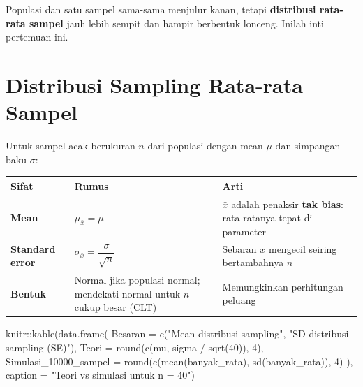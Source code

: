 \documentclass[
  indonesian,
  letterpaper,
]{book}
\newenvironment{Shaded}{\begin{snugshade}}{\end{snugshade}}
\newcommand{\AttributeTok}[1]{\textcolor[rgb]{0.40,0.45,0.13}{#1}}
\newcommand{\DecValTok}[1]{\textcolor[rgb]{0.68,0.00,0.00}{#1}}
\newcommand{\FunctionTok}[1]{\textcolor[rgb]{0.28,0.35,0.67}{#1}}
\newcommand{\NormalTok}[1]{\textcolor[rgb]{0.00,0.23,0.31}{#1}}
\newcommand{\SpecialCharTok}[1]{\textcolor[rgb]{0.37,0.37,0.37}{#1}}
\newcommand{\StringTok}[1]{\textcolor[rgb]{0.13,0.47,0.30}{#1}}
\newcounter{none} %
\begin{document}
Populasi dan satu sampel sama-sama menjulur kanan, tetapi
\textbf{distribusi rata-rata sampel} jauh lebih sempit dan hampir
berbentuk lonceng. Inilah inti pertemuan ini.

\section{Distribusi Sampling Rata-rata
Sampel}\label{distribusi-sampling-rata-rata-sampel}

Untuk sampel acak berukuran \(n\) dari populasi dengan mean \(\mu\) dan
simpangan baku \(\sigma\):

{\def\LTcaptype{none} %
\begin{longtable}[]{@{}
  >{\raggedright\arraybackslash}p{}
  >{\raggedright\arraybackslash}p{}
  >{\raggedright\arraybackslash}p{}@{}}
\toprule\noalign{}
\begin{minipage}[b]{\linewidth}\raggedright
Sifat
\end{minipage} & \begin{minipage}[b]{\linewidth}\raggedright
Rumus
\end{minipage} & \begin{minipage}[b]{\linewidth}\raggedright
Arti
\end{minipage} \\
\midrule\noalign{}
\endhead
\bottomrule\noalign{}
\endlastfoot
\textbf{Mean} & \(\mu_{\bar{x}} = \mu\) & \(\bar{x}\) adalah penaksir
\textbf{tak bias}: rata-ratanya tepat di parameter \\
\textbf{Standard error} &
\(\sigma_{\bar{x}} = \dfrac{\sigma}{\sqrt{n}}\) & Sebaran \(\bar{x}\)
mengecil seiring bertambahnya \(n\) \\
\textbf{Bentuk} & Normal jika populasi normal; mendekati normal untuk
\(n\) cukup besar (CLT) & Memungkinkan perhitungan peluang \\
\end{longtable}
}

\begin{Shaded}
\begin{Highlighting}[]
\NormalTok{knitr}\SpecialCharTok{::}\FunctionTok{kable}\NormalTok{(}\FunctionTok{data.frame}\NormalTok{(}
  \AttributeTok{Besaran =} \FunctionTok{c}\NormalTok{(}\StringTok{"Mean distribusi sampling"}\NormalTok{, }\StringTok{"SD distribusi sampling (SE)"}\NormalTok{),}
  \AttributeTok{Teori   =} \FunctionTok{round}\NormalTok{(}\FunctionTok{c}\NormalTok{(mu, sigma }\SpecialCharTok{/} \FunctionTok{sqrt}\NormalTok{(}\DecValTok{40}\NormalTok{)), }\DecValTok{4}\NormalTok{),}
  \AttributeTok{Simulasi\_10000\_sampel =} \FunctionTok{round}\NormalTok{(}\FunctionTok{c}\NormalTok{(}\FunctionTok{mean}\NormalTok{(banyak\_rata), }\FunctionTok{sd}\NormalTok{(banyak\_rata)), }\DecValTok{4}\NormalTok{)}
\NormalTok{), }\AttributeTok{caption =} \StringTok{"Teori vs simulasi untuk n = 40"}\NormalTok{)}
\end{Highlighting}
\end{Shaded}
\end{document}
